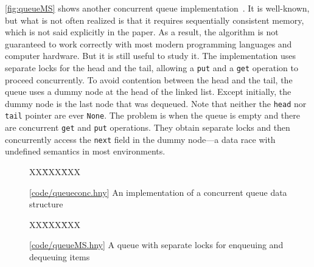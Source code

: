 \documentclass{report}
\newcommand{\harmonysource}[1]{
\begin{tabbing}
XX\=XXX\=XXX\kill
    
\end{tabbing}
}
\newcommand{\harmonylink}[1]{%
[\href{https://harmony.cs.cornell.edu/#1}{\underline{#1}}]%
}
\newenvironment{code}{
\tcolorbox
}{
\endtcolorbox
}
\begin{document}
\autoref{fig:queueMS} shows another
concurrent queue implementation~\cite{MS96}.
It is well-known, but what is not often realized is that
it requires sequentially consistent memory, which is not
said explicitly in the paper.
As a result, the algorithm is not guaranteed to work
correctly with most modern programming languages and
computer hardware.  But it is still useful to study it.
The implementation uses separate
locks for the head and the tail,
allowing a \texttt{put} and a \texttt{get} operation
to proceed concurrently.  To avoid contention between the head and the tail,
the queue uses a dummy node at the head of the linked list.
Except initially, the dummy node is the last node that was dequeued.
Note that neither the \texttt{head} nor \texttt{tail} pointer are
ever \texttt{None}.
The problem is when the queue is empty and there are concurrent
\texttt{get} and \texttt{put} operations.
They obtain separate locks and then concurrently access the
\texttt{next} field in the dummy node---a data race with
undefined semantics in most environments.

\begin{figure}
\begin{code}
\harmonysource{queueconc}
\end{code}
\caption{\harmonylink{code/queueconc.hny} An implementation of a concurrent queue data structure}
\label{fig:queueconc}
\end{figure}

\begin{figure}
\begin{code}
\harmonysource{queueMS}
\end{code}
\caption{\harmonylink{code/queueMS.hny} A queue with separate locks for enqueuing and dequeuing items}
\label{fig:queueMS}
\end{figure}
\end{document}
